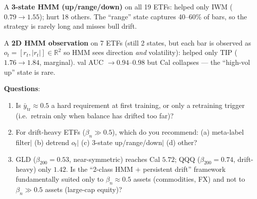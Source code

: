 \documentclass[11pt]{article}
\begin{document}
A \textbf{3-state HMM (up/range/down)} on all 19 ETFs: helped only IWM ($0.79 \to 1.55$); hurt 18 others. The ``range'' state captures 40--60\% of bars, so the strategy is rarely long and misses bull drift.

A \textbf{2D HMM observation} on 7 ETFs (still 2 states, but each bar is observed as $o_t = [r_t, |r_t|] \in \mathbb{R}^2$ so HMM sees direction \emph{and} volatility): helped only TIP ($1.76 \to 1.84$, marginal). val AUC $\to 0.94$--$0.98$ but Cal collapses --- the ``high-vol up'' state is rare.

\textbf{Questions}:

\begin{enumerate}
\item Is $\bar y_{\mathrm{tr}} \approx 0.5$ a hard requirement at first training, or only a retraining trigger (i.e.\ retrain only when balance has drifted too far)?

\item For drift-heavy ETFs ($\beta_n \gg 0.5$), which do you recommend:\enspace
(a) meta-label filter\enspace$\big|$\enspace
(b) detrend $o_t$\enspace$\big|$\enspace
(c) 3-state up/range/down\enspace$\big|$\enspace
(d) other?

\item GLD ($\beta_{200} = 0.53$, near-symmetric) reaches Cal $5.72$; QQQ ($\beta_{200} = 0.74$, drift-heavy) only $1.42$. Is the ``2-class HMM $+$ persistent drift'' framework fundamentally suited only to $\beta_n \approx 0.5$ assets (commodities, FX) and not to $\beta_n \gg 0.5$ assets (large-cap equity)?
\end{enumerate}
\end{document}
